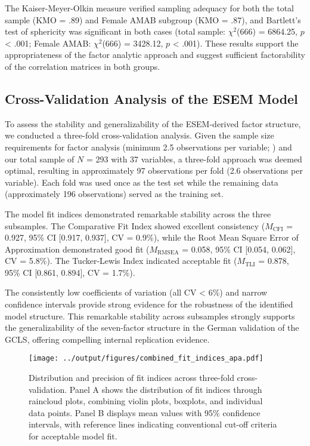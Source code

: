 \documentclass[12pt,a4paper]{article}
\begin{document}
The Kaiser-Meyer-Olkin measure verified sampling adequacy for both the total sample (KMO = .89) and Female AMAB subgroup (KMO = .87), and Bartlett's test of sphericity was significant in both cases (total sample: $\chi^2$(666) = 6864.25, $p$ < .001; Female AMAB: $\chi^2$(666) = 3428.12, $p$ < .001). These results support the appropriateness of the factor analytic approach and suggest sufficient factorability of the correlation matrices in both groups.

\subsection{Cross-Validation Analysis of the ESEM Model}

To assess the stability and generalizability of the ESEM-derived factor structure, we conducted a three-fold cross-validation analysis. Given the sample size requirements for factor analysis (minimum 2.5 observations per variable; \textcite{Cattell1978}) and our total sample of $N$ = 293 with 37 variables, a three-fold approach was deemed optimal, resulting in approximately 97 observations per fold (2.6 observations per variable). Each fold was used once as the test set while the remaining data (approximately 196 observations) served as the training set.

The model fit indices demonstrated remarkable stability across the three subsamples. The Comparative Fit Index showed excellent consistency ($M_{\text{CFI}}$ = 0.927, 95\% CI [0.917, 0.937], CV = 0.9\%), while the Root Mean Square Error of Approximation demonstrated good fit ($M_{\text{RMSEA}}$ = 0.058, 95\% CI [0.054, 0.062], CV = 5.8\%). The Tucker-Lewis Index indicated acceptable fit ($M_{\text{TLI}}$ = 0.878, 95\% CI [0.861, 0.894], CV = 1.7\%).

The consistently low coefficients of variation (all CV < 6\%) and narrow confidence intervals provide strong evidence for the robustness of the identified model structure. This remarkable stability across subsamples strongly supports the generalizability of the seven-factor structure in the German validation of the GCLS, offering compelling internal replication evidence.

\begin{figure}[h]
\centering
\texttt{[image: ../output/figures/combined\_fit\_indices\_apa.pdf]}
\caption{Distribution and precision of fit indices across three-fold cross-validation. Panel A shows the distribution of fit indices through raincloud plots, combining violin plots, boxplots, and individual data points. Panel B displays mean values with 95\% confidence intervals, with reference lines indicating conventional cut-off criteria for acceptable model fit.}
\label{fig:cross_validation}
\end{figure}
\end{document}
